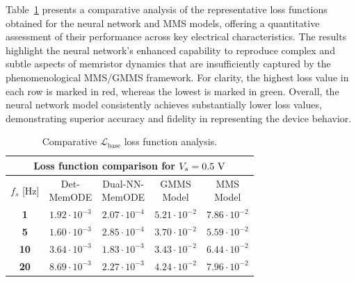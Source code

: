 \documentclass[lettersize,journal]{IEEEtran}
\begin{document}
Table~\ref{tab:mms_comp} presents a comparative analysis of the representative loss functions obtained for the neural network and MMS models, offering a quantitative assessment of their performance across key electrical characteristics. The results highlight the neural network’s enhanced capability to reproduce complex and subtle aspects of memristor dynamics that are insufficiently captured by the phenomenological MMS/GMMS framework. For clarity, the highest loss value in each row is marked in red, whereas the lowest is marked in green. Overall, the neural network model consistently achieves substantially lower loss values, demonstrating superior accuracy and fidelity in representing the device behavior.

\begin{table}
  \caption{Comparative \(\mathcal{L}_{\mathrm{base}}\) loss function analysis.}
  \label{tab:mms_comp}
  \centering
  \begin{tabular}{c|cccc}
    \toprule
    \multicolumn{5}{c}{\textbf{Loss function comparison for \(V_s = 0.5 \rm \ V\)}}                                                                                        \\
    \midrule
    \(f_s\) [Hz] & \makecell{Det-                                                                                                                                          \\MemODE}             & \makecell{Dual-NN-                                                                                                             \\ MemODE}                 & \makecell{GMMS\\Model}             & \makecell{MMS\\Model}                                        \\
    \midrule
    \textbf{1}   & \(1.92 \cdot 10^{-3}\) & \color{ieeegreen} \bfseries \(2.07 \cdot 10^{-4}\) & \(5.21 \cdot 10^{-2}\) & \color{ieeered} \bfseries \(7.86 \cdot 10^{-2}\) \\
    \textbf{5}   & \(1.60 \cdot 10^{-3}\) & \color{ieeegreen} \bfseries \(2.85 \cdot 10^{-4}\) & \(3.70 \cdot 10^{-2}\) & \color{ieeered} \bfseries \(5.59 \cdot 10^{-2}\) \\
    \textbf{10}  & \(3.64 \cdot 10^{-3}\) & \color{ieeegreen} \bfseries \(1.83 \cdot 10^{-3}\) & \(3.43 \cdot 10^{-2}\) & \color{ieeered} \bfseries \(6.44 \cdot 10^{-2}\) \\
    \textbf{20}  & \(8.69 \cdot 10^{-3}\) & \color{ieeegreen} \bfseries \(2.27 \cdot 10^{-3}\) & \(4.24 \cdot 10^{-2}\) & \color{ieeered} \bfseries \(7.96 \cdot 10^{-2}\) \\

\end{tabular}
\end{table}
\end{document}
